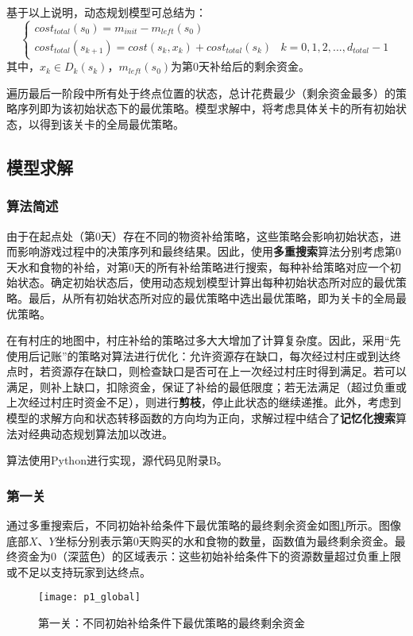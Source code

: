 \documentclass[bwprint]{cumcmthesis} %
\begin{document}
基于以上说明，动态规划模型可总结为：
\begin{equation}
    \begin{cases}
        cost_{total}(s_0)=m_{init}-m_{left}(s_0) \\
        cost_{total}(s_{k+1})=cost(s_k,x_k)+cost_{total}(s_k) & k=0,1,2,...,d_{total}-1
    \end{cases}
\end{equation}
其中，$x_k \in D_k(s_k)$，$m_{left}(s_0)$为第0天补给后的剩余资金。

遍历最后一阶段中所有处于终点位置的状态，总计花费最少（剩余资金最多）的策略序列即为该初始状态下的最优策略。模型求解中，将考虑具体关卡的所有初始状态，以得到该关卡的全局最优策略。

\subsection{模型求解}
\subsubsection{算法简述}
由于在起点处（第0天）存在不同的物资补给策略，这些策略会影响初始状态，进而影响游戏过程中的决策序列和最终结果。因此，使用\textbf{多重搜索}算法分别考虑第0天水和食物的补给，对第0天的所有补给策略进行搜索，每种补给策略对应一个初始状态。确定初始状态后，使用动态规划模型计算出每种初始状态所对应的最优策略。最后，从所有初始状态所对应的最优策略中选出最优策略，即为关卡的全局最优策略。

在有村庄的地图中，村庄补给的策略过多大大增加了计算复杂度。因此，采用“先使用后记账”的策略对算法进行优化：允许资源存在缺口，每次经过村庄或到达终点时，若资源存在缺口，则检查缺口是否可在上一次经过村庄时得到满足。若可以满足，则补上缺口，扣除资金，保证了补给的最低限度；若无法满足（超过负重或上次经过村庄时资金不足），则进行\textbf{剪枝}，停止此状态的继续递推。此外，考虑到模型的求解方向和状态转移函数的方向均为正向，求解过程中结合了\textbf{记忆化搜索}算法对经典动态规划算法加以改进。

算法使用Python进行实现，源代码见附录B。
\subsubsection{第一关}
通过多重搜索后，不同初始补给条件下最优策略的最终剩余资金如图\ref{p1_global}所示。图像底部$X$、$Y$坐标分别表示第0天购买的水和食物的数量，函数值为最终剩余资金。最终资金为0（深蓝色）的区域表示：这些初始补给条件下的资源数量超过负重上限或不足以支持玩家到达终点。
\begin{figure}
    \centering
    \texttt{[image: p1\_global]}
    \caption{第一关：不同初始补给条件下最优策略的最终剩余资金}
    \label{p1_global}
\end{figure}
\end{document}
